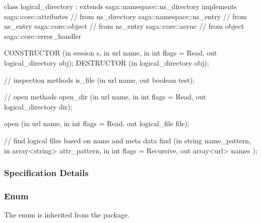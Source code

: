 \begin{myspec}
{ 
    class logical_directory : extends            saga::namespace::ns_directory
                              implements         saga::core::attributes
                           // from ns_directory  saga::namespace::ns_entry
                           // from ns_entry      saga::core::object
                           // from ns_entry      saga::core::async
                           // from object        saga::core::error_handler
    {
 
      CONSTRUCTOR     (in  session             s,
                       in  url                 name,
                       in  int                 flags = Read,
                       out logical_directory   obj);
      DESTRUCTOR      (in  logical_directory   obj);
 
 
      // inspection methods
      is_file         (in  url                 name,
                       out boolean             test);
 
      // open methods
      open_dir        (in  url                 name,
                       in  int                 flags = Read,
                       out logical_directory   dir);
 
      open            (in  url                 name,
                       in  int                 flags = Read,
                       out logical_file        file);
 
      // find logical files based on name and meta data
      find            (in  string              name_pattern,
                       in  array<string>       attr_pattern,
                       in  int                 flags = Recursive,
                       out array<url>          names   );
    }
  }
 \end{myspec}
 
 
 \subsubsection{Specification Details}
 
  \subsubsection*{Enum }
 
   The  enum is inherited from the 
   package.  
  
